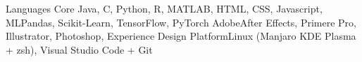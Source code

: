 \begin{cvskills}
	\cvskill
   	{Languages}	{Core Java, C, Python, R, MATLAB, HTML, CSS, Javascript, }
    \cvskill
     {ML}{Pandas, Scikit-Learn, TensorFlow, PyTorch}
     \cvskill
     {Adobe}{After Effects, Primere Pro, Illustrator, Photoshop, Experience Design}
      \cvskill
     {Platform}{Linux (Manjaro KDE Plasma + zsh), Visual Studio Code + Git}
    \vspace{-8mm}
\end{cvskills}
